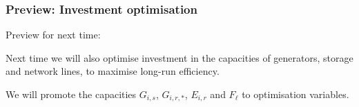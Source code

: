 \documentclass[10pt,aspectratio=169,dvipsnames]{beamer}
\begin{document}
\begin{frame}[fragile]
  \frametitle{Preview: Investment optimisation}

  Preview for next time:

  Next time we will also optimise \alert{investment} in the \alert{capacities} of generators,
  storage and network lines, to maximise \alert{long-run efficiency}.

  We will promote the capacities $G_{i,s}$, $G_{i,r,*}$, $E_{i,r}$ and
  $F_{\ell}$ to optimisation variables.

\end{frame}
\end{document}
